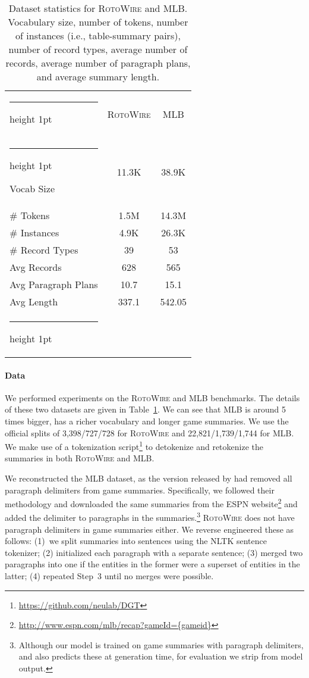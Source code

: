 \documentclass[11pt,a4paper]{article}
\makeatletter
\newcommand{\xml}[1]{{\fontfamily{cmtt}\selectfont {#1}}}
\newcommand{\thickhline}{\noalign {\ifnum 0=`}\fi \hrule height 1pt
    \futurelet \reserved@a \@xhline
}
\makeatother
\begin{document}
\begin{table}[t]
  \footnotesize
\centering
  \begin{tabular}{lcc} \thickhline 
  & \textsc{RotoWire} & MLB \\ 
\thickhline 
Vocab Size & 11.3K & 38.9K \\ 
\# Tokens & 1.5M & 14.3M \\ 
\# Instances & 4.9K & 26.3K \\ 
\# Record Types & 39 & 53 \\ 
Avg Records & 628 & 565 \\ 
Avg Paragraph Plans & 10.7 & 15.1 \\ 
Avg  Length & 337.1 & 542.05 \\ \thickhline  
\end{tabular}
\caption{\label{dataset-stats}
Dataset statistics for  \textsc{RotoWire} and MLB.  Vocabulary size,
number of tokens, number of instances (i.e., table-summary pairs),
number of record types, average number of records, average number of
paragraph plans, and 
average summary length.}
    \end{table}



\paragraph{Data}

We performed experiments on the \textsc{RotoWire}
\cite{wiseman-etal-2017-challenges} and MLB
\cite{puduppully-etal-2019-data} benchmarks.  The details of these two
datasets are given in Table~\ref{dataset-stats}. We can see that MLB
is around 5 times bigger, has a richer vocabulary and longer game
summaries.  We use the official splits of 3,398/727/728 for
\textsc{RotoWire} and 22,821/1,739/1,744 for MLB.
We make use of
a tokenization script\footnote{\url{https://github.com/neulab/DGT}} to
detokenize and retokenize the summaries in both \textsc{RotoWire} and MLB.


We reconstructed the MLB dataset, as the version released by
\citet{puduppully-etal-2019-data} had removed all paragraph delimiters
from game summaries. Specifically, we followed their methodology and
downloaded the same summaries from the ESPN
website\footnote{\url{http://www.espn.com/mlb/recap?gameId={gameid}}}
and added the \textcolor{blue}{\xml{P}} delimiter to paragraphs in the
summaries.\footnote{Although our model is trained on game summaries
  with paragraph delimiters, and also predicts these at generation
  time, for evaluation we strip \textcolor{blue}{\xml{P}} from model
  output.}
\textsc{RotoWire} does not have paragraph delimiters in game summaries
either. We reverse engineered these as follows: (1)~we split summaries
into sentences using the NLTK \cite{BirdKleinLoper09} sentence
tokenizer; (2) initialized each paragraph with a separate sentence;
(3) merged two paragraphs into one if the entities in the former were
a superset of entities in the latter; (4) repeated Step~3 until no
 merges were possible.
\end{document}
